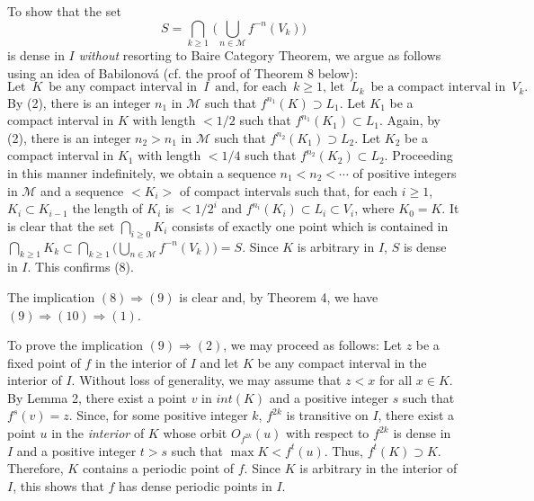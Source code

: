 \documentclass[12pt]{article}
\begin{document}
To show that the set
$$
S = \bigcap_{k \ge 1} \, \big(\bigcup_{n \in \mathcal M} f^{-n}(V_k)\big)
$$
is dense in $I$ {\it without} resorting to Baire Category Theorem, we argue as follows using an idea of Babilonov\'a {\bf\cite{bab}} (cf. the proof of Theorem 8 below): 
$$
\text{Let} \,\,\, K \,\,\, \text{be any compact interval in} \,\,\, I \,\,\, \text{and, for each} \,\,\, k \ge 1, \, \text{let} \,\,\, L_k \,\,\, \text{be a compact interval in} \,\,\, V_k.
$$
By (2), there is an integer $n_1$ in $\mathcal M$ such that $f^{n_1}(K) \supset L_1$.  Let $K_1$ be a compact interval in $K$ with length $< 1/2$ such that $f^{n_1}(K_1) \subset L_1$.  Again, by (2), there is an integer $n_2 > n_1$ in $\mathcal M$ such that $f^{n_2}(K_1) \supset L_2$.  Let $K_2$ be a compact interval in $K_1$ with length $< 1/4$ such that $f^{n_2}(K_2) \subset L_2$.  Proceeding in this manner indefinitely, we obtain a sequence $n_1 < n_2 < \cdots$ of positive integers in $\mathcal M$ and a sequence $< K_i >$ of compact intervals such that, for each $i \ge 1$, $K_i \subset K_{i-1}$ the length of $K_i$ is $< 1/2^i$ and $f^{n_i}(K_i) \subset L_i \subset V_i$, where $K_0 = K$.  It is clear that the set $\bigcap_{i \ge 0} K_i$ consists of exactly one point which is contained in $\bigcap_{k \ge 1} K_k \subset \bigcap_{k \ge 1} \big(\bigcup_{n \in \mathcal M} f^{-n}(V_k)\big) = S$.  Since $K$ is arbitrary in $I$, $S$ is dense in $I$.  This confirms (8).  

The implication ${(8)} \Rightarrow {(9)}$ is clear and, by Theorem 4, we have ${(9)} \Rightarrow {(10)} \Rightarrow {(1)}$. 

To prove the implication $(9) \Rightarrow (2)$, we may proceed as follows: Let $z$ be a fixed point of $f$ in the interior of $I$ and let $K$ be any compact interval in the interior of $I$.  Without loss of generality, we may assume that $z < x$ for all $x \in K$.  By Lemma 2, there exist a point $v$ in $int(K)$ and a positive integer $s$ such that $f^s(v) = z$.  Since, for some positive integer $k$, $f^{2k}$ is transitive on $I$, there exist a point $u$ in the {\it interior} of $K$ whose orbit $O_{f^{2k}}(u)$ with respect to $f^{2k}$ is dense in $I$ and a positive integer $t > s$ such that $\max K < f^t(u)$.  Thus, $f^t(K) \supset K$.  Therefore, $K$ contains a periodic point of $f$.  Since $K$ is arbitrary in the interior of $I$, this shows that $f$ has dense periodic points in $I$.  
\end{document}
